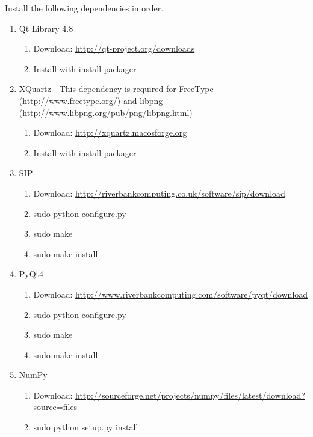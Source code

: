 \documentclass[a4paper,10pt]{article}
\begin{document}
        Install the following dependencies in order.
        \begin{enumerate}

            \item Qt Library 4.8 
                \begin{enumerate}
                    \item Download: \url{http://qt-project.org/downloads}
                    \item Install with install packager
                \end{enumerate}

            \item XQuartz - This dependency is required for FreeType
                (\url{http://www.freetype.org/}) and libpng
                (\url{http://www.libpng.org/pub/png/libpng.html}) 
                \begin{enumerate}
                    \item Download: \url{http://xquartz.macosforge.org}
                    \item Install with install packager
                \end{enumerate}

            \item SIP 
                \begin{enumerate}
                    \item Download:
                        \url{http://riverbankcomputing.co.uk/software/sip/download}
                    \item sudo python configure.py
                    \item sudo make
                    \item sudo make install
                \end{enumerate}

            \item PyQt4 
                \begin{enumerate}
                    \item Download:
                        \url{http://www.riverbankcomputing.com/software/pyqt/download}
                    \item sudo python configure.py
                    \item sudo make
                    \item sudo make install
                \end{enumerate}

            \item NumPy 
                \begin{enumerate}
                    \item Download:
                        \url{http://sourceforge.net/projects/numpy/files/latest/download?source=files}
                    \item sudo python setup.py install
                \end{enumerate}


\end{enumerate}
\end{document}
